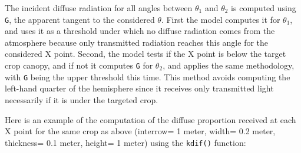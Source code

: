 \documentclass[]{book}
\theoremstyle{definition}
\theoremstyle{definition}
\theoremstyle{definition}
\theoremstyle{remark}
\begin{document}
The incident diffuse radiation for all angles between \(\theta_1\) and
\(\theta_2\) is computed using \texttt{G}, the apparent tangent to the
considered \(\theta\). First the model computes it for \(\theta_1\), and
uses it as a threshold under which no diffuse radiation comes from the
atmosphere because only transmitted radiation reaches this angle for the
considered X point. Second, the model tests if the X point is below the
target crop canopy, and if not it computes \texttt{G} for \(\theta_2\),
and applies the same methodology, with \texttt{G} being the upper
threshold this time. This method avoids computing the left-hand quarter
of the hemisphere since it receives only transmitted light necessarily
if it is under the targeted crop.

Here is an example of the computation of the diffuse proportion received
at each X point for the same crop as above (interrow= 1 meter, width=
0.2 meter, thickness= 0.1 meter, height= 1 meter) using the
\texttt{kdif()} function:
\end{document}
